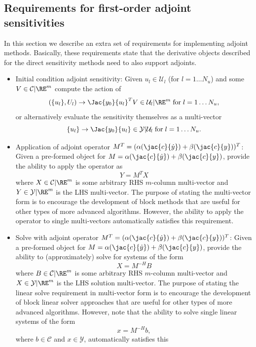 \documentclass[pdf,ps2pdf,11pt]{SANDreport}
\begin{document}
\subsection{Requirements for first-order adjoint sensitivities}

In this section we describe an extra set of requirements for implementing
adjoint methods.  Basically, these requirements state that the derivative
objects described for the direct sensitivity methods need to also support
adjoints.

\begin{itemize}

{}\item Initial condition adjoint sensitivity: Given $u_l\in\mathcal{U}_l$ (for
$l=1\ldots{}N_u$) and some $V\in\mathcal{C}|\RE^m$ compute the action of
\[
(\{u_l\},U_l) {}\rightarrow \Jac{y_0}{u_l}^T V \in \mathcal{U}_l|\RE^m
\; \mbox{for} \; l = 1 {}\ldots N_u,
\]
or alternatively evaluate the sensitivity themselves as a multi-vector
\[
\{u_l\} {}\rightarrow \Jac{y_0}{u_l} \in \mathcal{Y}|\mathcal{U}_l
\; \mbox{for} \; l = 1 {}\ldots N_u.
\]
%
{}\item Application of adjoint operator $M^T = ({}\alpha (\jac{c}{\dot{y}}) +
{}\beta (\jac{c}{y}))^T$: Given a pre-formed object for $M = {}\alpha
(\jac{c}{\dot{y}}) + {}\beta (\jac{c}{y})$, provide the ability to apply the
operator as
\[
Y = M^T X
\]
where $X\in\mathcal{C}|\RE^m$ is some arbitrary RHS $m$-column multi-vector
and $Y\in\mathcal{Y}|\RE^m$ is the LHS multi-vector.  The purpose of stating
the multi-vector form is to encourage the development of block methods that
are useful for other types of more advanced algorithms.  However, the ability
to apply the operator to single multi-vectors automatically satisfies this
requirement.
%
{}\item Solve with adjoint operator $M^T = ({}\alpha (\jac{c}{\dot{y}}) +
{}\beta (\jac{c}{y}))^T$: Given a pre-formed object for $M = {}\alpha
(\jac{c}{\dot{y}}) + {}\beta (\jac{c}{y})$, provide the ability to
(approximately) solve for systems of the form
\[
X = M^{-H} B
\]
where $B\in\mathcal{C}|\RE^m$ is some arbitrary RHS $m$-column multi-vector
and $X\in\mathcal{Y}|\RE^m$ is the LHS solution multi-vector.  The purpose of
stating the linear solve requirement in multi-vector form is to encourage the
development of block linear solver approaches that are useful for other types
of more advanced algorithms.  However, note that the ability to solve single
linear systems of the form
\[
x = M^{-H} b,
\]
where $b\in\mathcal{C}$ and $x\in\mathcal{Y}$, automatically satisfies this

\end{itemize}
\end{document}
